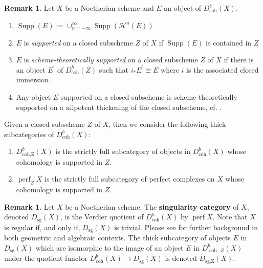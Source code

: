 \documentclass[11pt]{amsart}
\theoremstyle{plain}
\theoremstyle{definition}
\newtheorem{remark}[theorem]{Remark}
\numberwithin{equation}{section}
\numberwithin{theorem}{section}
\begin{document}
\begin{remark}
    Let $X$ be a Noetherian scheme and $E$ an object of $D^b_{\operatorname{coh}}(X)$.
    \begin{enumerate}
        \item $\operatorname{Supp}(E):= \cup_{n=-\infty}^\infty \operatorname{Supp}(\mathcal{H}^n (E))$
        \item $E$ is \textit{supported} on a closed subscheme $Z$ of $X$ if $\operatorname{Supp}(E)$ is contained in $Z$
        \item $E$ is \textit{scheme-theoretically supported} on a closed subscheme $Z$ of $X$ if there is an object $E^\prime$ of $D^b_{\operatorname{coh}}(Z)$ such that $i_\ast E^\prime \cong E$ where $i$ is the associated closed immersion.
        \item Any object $E$ supported on a closed subscheme is scheme-theoretically supported on a nilpotent thickening of the closed subscheme, cf. \cite[Lemma 7.40]{Rouquier:2008}.
    \end{enumerate}
    Given a closed subscheme $Z$ of $X$, then we consider the following thick subcategories of $D^b_{\operatorname{coh}}(X)$:
        \begin{enumerate}
            \item $D^b_{\operatorname{coh,Z}}(X)$ is the strictly full subcategory of objects in $D^b_{\operatorname{coh}}(X)$ whose cohomology is supported in $Z$.
            \item $\operatorname{perf}_Z X$ is the strictly full subcategory of perfect complexes on $X$ whose cohomology is supported in $Z$.
        \end{enumerate}
\end{remark}

\begin{remark}\label{rmk:singularity_categories}
    Let $X$ be a Noetherian scheme. The \textbf{singularity category} of $X$, denoted $D_{\operatorname{sg}}(X)$, is the Verdier quotient of $D^b_{\operatorname{coh}}(X)$ by $\operatorname{perf}X$. Note that $X$ is regular if, and only if, $D_{\operatorname{sg}}(X)$ is trivial. Please see \cite{Orlov:2004,Buchweitz/Appendix:2021} for further background in both geometric and algebraic contexts. The thick subcategory of objects $E$ in $D_{\operatorname{sg}}(X)$ which are isomorphic to the image of an object $E$ in $D^b_{\operatorname{coh},Z} (X)$ under the quotient functor $D^b_{\operatorname{coh}}(X) \to D_{\operatorname{sg}}(X)$ is denoted $D_{\operatorname{sg,Z}}(X)$.
\end{remark}
\end{document}

